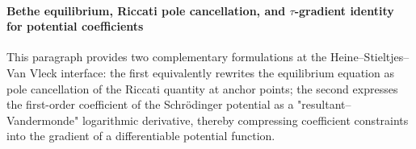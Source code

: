 
\paragraph{Bethe equilibrium, Riccati pole cancellation, and \texorpdfstring{$\tau$}{tau}-gradient identity for potential coefficients}
This paragraph provides two complementary formulations at the Heine--Stieltjes--Van Vleck interface: the first equivalently rewrites the equilibrium equation as pole cancellation of the Riccati quantity at anchor points; the second expresses the first-order coefficient of the Schr\"odinger potential as a "resultant--Vandermonde" logarithmic derivative, thereby compressing coefficient constraints into the gradient of a differentiable potential function.

